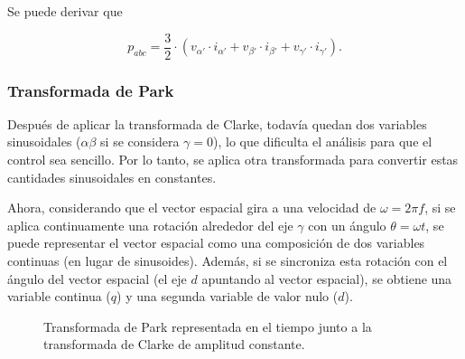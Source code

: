 Se puede derivar que

\begin{equation}
p_{abc} = \frac{3}{2} \cdot (v_{\alpha'} \cdot i_{\alpha'} + v_{\beta'} \cdot i_{\beta'} + v_{\gamma'} \cdot i_{\gamma'}) \text{.}
\end{equation}


\subsubsection{Transformada de Park}

Después de aplicar la transformada de Clarke, todavía quedan dos variables sinusoidales (\(\alpha\beta\) si se considera \(\gamma = 0\)), lo que dificulta el análisis para que el control sea sencillo. Por lo tanto, se aplica otra transformada para convertir estas cantidades sinusoidales en constantes.

Ahora, considerando que el vector espacial gira a una velocidad de \(\omega = 2\pi f\), si se aplica continuamente una rotación alrededor del eje \(\gamma\) con un ángulo \(\theta = \omega  t\), se puede representar el vector espacial como una composición de dos variables continuas (en lugar de sinusoides). Además, si se sincroniza esta rotación con el ángulo del vector espacial (el eje \(d\) apuntando al vector espacial), se obtiene una variable continua (\(q\)) y una segunda variable de valor nulo (\(d\)).

\begin{figure}[H]
  	\centering
  \hspace*{-1.5cm}
  \caption{Transformada de Park representada en el tiempo junto a la transformada de Clarke de amplitud constante.}
\end{figure}

